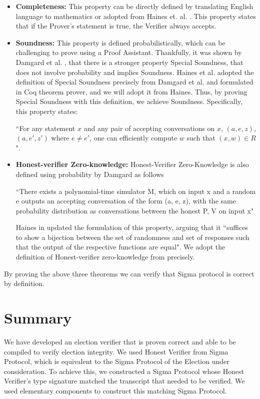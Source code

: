 \begin{itemize}
\item \textbf{Completeness:} This property can be directly defined by translating English language to mathematics or adopted from Haines et. al. \cite{Haines2019VerifiedVF}. This property states that if the Prover's statement is true, the Verifier always accepts.

\item \textbf{Soundness:} This property is defined probabilistically, which can be challenging to prove using a Proof Assistant. Thankfully, it was shown by Damgard et al. \cite{damgaard2010sigma}, that there is a stronger property Special Soundness, that does not involve probability and implies Soundness. Haines et al. \cite{Haines2021DidYM} adopted the definition of Special Soundness precisely from Damgard et al. \cite{damgaard2010sigma} and formulated in Coq theorem prover, and we will adopt it from Haines. Thus, by proving Special Soundness with this definition, we achieve Soundness. Specifically, this property states:

``For any statement $x$ and any pair of accepting conversations on $x$, $(a,e,z)$, $(a,e',z')$ where $e \neq e'$, one can efficiently compute $w$ such that $(x, w) \in R$"\cite{Haines2021DidYM}.

\item \textbf{Honest-verifier Zero-knowledge:} Honest-Verifier Zero-Knowledge is also defined using probability by Damgard \cite{damgaard2010sigma} as follows 

    ``There exists a polynomial-time simulator M, which on input x and a random e outputs an accepting conversation of the form (a, e, z), with the same probability distribution as conversations between the honest P, V on input x" 
    
    Haines in \cite{Haines2021DidYM} updated the formulation of this property, arguing that it ``suffices to show a bijection between the set of randomness and set of responses such that the output of the respective functions are equal".  We adopt the definition of Honest-verifier zero-knowledge from \cite{Haines2021DidYM} precisely.
\end{itemize}
    By proving the above three theorems we can verify that Sigma protocol is correct by definition.

\section{Summary}
We have developed an election verifier that is proven correct and able to be compiled to verify election integrity. We used Honest Verifier from Sigma Protocol, which is equivalent to the Sigma Protocol of the Election under consideration. To achieve this, we constructed a Sigma Protocol whose Honest Verifier's type signature matched the transcript that needed to be verified. We used elementary components to construct this matching Sigma Protocol.

